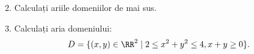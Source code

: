 \vspace{0.5cm}

2. Calculați ariile domeniilor de mai sus.

\vspace{0.5cm}

3. Calculați aria domeniului:
\[
  D = \{(x, y) \in \RR^2 \mid 2 \leq x^2 + y^2 \leq 4, x + y \geq 0 \}.
\]

